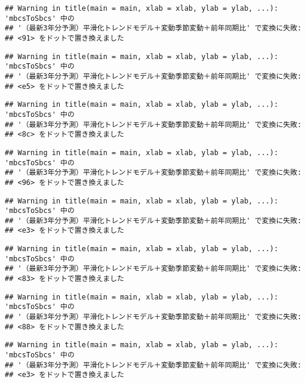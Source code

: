 \documentclass[]{article}
\begin{document}
\begin{verbatim}
## Warning in title(main = main, xlab = xlab, ylab = ylab, ...): 'mbcsToSbcs' 中の
## '（最新3年分予測）平滑化トレンドモデル＋変動季節変動＋前年同期比' で変換に失敗:
## <91> をドットで置き換えました
\end{verbatim}

\begin{verbatim}
## Warning in title(main = main, xlab = xlab, ylab = ylab, ...): 'mbcsToSbcs' 中の
## '（最新3年分予測）平滑化トレンドモデル＋変動季節変動＋前年同期比' で変換に失敗:
## <e5> をドットで置き換えました
\end{verbatim}

\begin{verbatim}
## Warning in title(main = main, xlab = xlab, ylab = ylab, ...): 'mbcsToSbcs' 中の
## '（最新3年分予測）平滑化トレンドモデル＋変動季節変動＋前年同期比' で変換に失敗:
## <8c> をドットで置き換えました
\end{verbatim}

\begin{verbatim}
## Warning in title(main = main, xlab = xlab, ylab = ylab, ...): 'mbcsToSbcs' 中の
## '（最新3年分予測）平滑化トレンドモデル＋変動季節変動＋前年同期比' で変換に失敗:
## <96> をドットで置き換えました
\end{verbatim}

\begin{verbatim}
## Warning in title(main = main, xlab = xlab, ylab = ylab, ...): 'mbcsToSbcs' 中の
## '（最新3年分予測）平滑化トレンドモデル＋変動季節変動＋前年同期比' で変換に失敗:
## <e3> をドットで置き換えました
\end{verbatim}

\begin{verbatim}
## Warning in title(main = main, xlab = xlab, ylab = ylab, ...): 'mbcsToSbcs' 中の
## '（最新3年分予測）平滑化トレンドモデル＋変動季節変動＋前年同期比' で変換に失敗:
## <83> をドットで置き換えました
\end{verbatim}

\begin{verbatim}
## Warning in title(main = main, xlab = xlab, ylab = ylab, ...): 'mbcsToSbcs' 中の
## '（最新3年分予測）平滑化トレンドモデル＋変動季節変動＋前年同期比' で変換に失敗:
## <88> をドットで置き換えました
\end{verbatim}

\begin{verbatim}
## Warning in title(main = main, xlab = xlab, ylab = ylab, ...): 'mbcsToSbcs' 中の
## '（最新3年分予測）平滑化トレンドモデル＋変動季節変動＋前年同期比' で変換に失敗:
## <e3> をドットで置き換えました
\end{verbatim}
\end{document}
